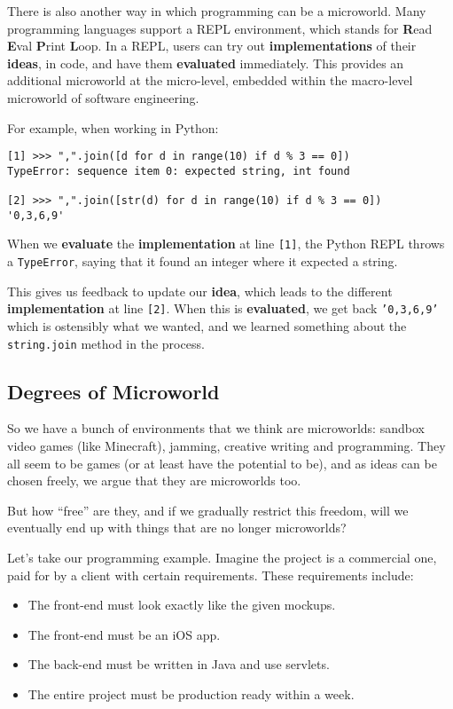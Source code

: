 There is also another way in which programming can be a microworld. Many programming languages support a REPL environment, which stands for \textbf{R}ead \textbf{E}val \textbf{P}rint \textbf{L}oop. In a REPL, users can try out \textbf{implementations} of their \textbf{ideas}, in code, and have them \textbf{evaluated} immediately. This provides an additional microworld at the micro-level, embedded within the macro-level microworld of software engineering.

For example, when working in Python:

\begin{verbatim}
[1] >>> ",".join([d for d in range(10) if d % 3 == 0])
TypeError: sequence item 0: expected string, int found

[2] >>> ",".join([str(d) for d in range(10) if d % 3 == 0])
'0,3,6,9'
\end{verbatim}

When we \textbf{evaluate} the \textbf{implementation} at line \texttt{[1]}, the Python REPL throws a \texttt{TypeError}, saying that it found an integer where it expected a string. 

This gives us feedback to update our \textbf{idea}, which leads to the different \textbf{implementation} at line \texttt{[2]}. When this is \textbf{evaluated}, we get back \texttt{'0,3,6,9'} which is ostensibly what we wanted, and we learned something about the \texttt{string.join} method in the process.

\subsection{Degrees of Microworld}

So we have a bunch of environments that we think are microworlds:
sandbox video games (like Minecraft), jamming, creative writing and
programming. They all seem to be games (or at least have the potential
to be), and as ideas can be chosen freely, we argue that they are
microworlds too.

But how ``free'' are they, and if we gradually restrict this freedom,
will we eventually end up with things that are no longer microworlds?

Let's take our programming example. Imagine the project is a commercial
one, paid for by a client with certain requirements. These requirements
include: 

\begin{itemize}

\item The front-end must look exactly like the given mockups. 
\item The front-end must be an iOS app. 
\item The back-end must be written in Java and use servlets. 
\item The entire project must be production ready within a week.

\end{itemize}

